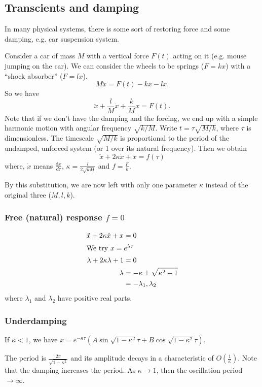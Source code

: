 \documentclass[a4paper]{article}
\theoremstyle{definition}
\renewcommand{\d}{\mathrm{d}}
\begin{document}
\subsection{Transcients and damping}
In many physical systems, there is some sort of restoring force and some damping, e.g. car suspension system.

Consider a car of mass $M$ with a vertical force $F(t)$ acting on it (e.g. mouse jumping on the car). We can consider the wheels to be springs ($F = kx$) with a ``shock absorber'' ($F = l\dot x$).
\[
M\ddot x = F(t) - kx - l\dot x.
\]
So we have
\[
\ddot x + \frac{l}{M}\dot x + \frac{k}{M}x = F(t).
\]
Note that if we don't have the damping and the forcing, we end up with a simple harmonic motion with angular frequency $\sqrt{k/M}$. Write $t = \tau \sqrt{M/k}$, where $\tau$ is dimensionless. The timescale $\sqrt{M/k}$ is proportional to the period of the undamped, unforced system (or 1 over its natural frequency). Then we obtain
\[
\ddot x + 2\kappa\dot x + x = f(\tau)
\]
where, $\dot x$ means $\frac{\d x}{d\tau}$, $\kappa = \frac{l}{2\sqrt{kM}}$ and $f = \frac{F}{k}$.

By this substitution, we are now left with only one parameter $\kappa$ instead of the original three ($M, l, k$).

\subsubsection{Free (natural) response \texorpdfstring{$f = 0$}{f = 0}}
\begin{align*}
  \ddot x + 2\kappa \dot x + x &= 0\\
\intertext{We try $x = e^{\lambda \tau}$}
  \lambda + 2\kappa\lambda + 1 &= 0\\
  \lambda &= -\kappa \pm \sqrt{\kappa^2 - 1}\\
  &= -\lambda_1, \lambda_2
\end{align*}
where $\lambda_1$ and $\lambda_2$ have positive real parts.

\subsubsection{Underdamping}

If $\kappa < 1$, we have $x = e^{-\kappa\tau}(A\sin \sqrt{1 - \kappa^2}\tau  +B\cos \sqrt{1 - \kappa^2}\tau)$.

The period is $\frac{2\pi}{\sqrt{1 - \kappa^2}}$ and its amplitude decays in a characteristic of $O(\frac{1}{\kappa})$. Note that the damping increases the period. As $\kappa \to 1$, then the oscillation period $\to \infty$.
\end{document}
